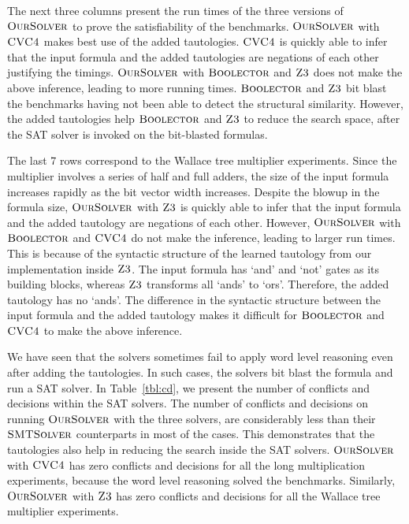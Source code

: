 

The next three columns present the run times of the three versions of
$\textsc{OurSolver}$ to prove the satisfiability of the benchmarks.
%
$\textsc{OurSolver}$ with $\textsc{CVC4}$ makes best use of the added tautologies.
%
$\textsc{CVC4}$ is quickly able to infer that the input formula and the
added tautologies are negations of each other justifying the timings.
%
$\textsc{OurSolver}$ with $\textsc{Boolector}$ and $\textsc{Z3}$ does not make the above
inference, leading to more running times.
%
$\textsc{Boolector}$ and $\textsc{Z3}$ bit blast the benchmarks having not been
able to detect the structural similarity.
%
However, the added tautologies help $\textsc{Boolector}$ and $\textsc{Z3}$ to
reduce the search space, after the SAT solver is invoked on the
bit-blasted formulas.


The last 7 rows correspond to the Wallace tree multiplier experiments.
%
Since the multiplier involves a series of half and full adders, the
size of the input formula increases rapidly as the bit vector width
increases.
%
Despite the blowup in the formula size, $\textsc{OurSolver}$ with $\textsc{Z3}$ is
quickly able to infer that the input formula and the added tautology
are negations of each other.
%
However, $\textsc{OurSolver}$ with $\textsc{Boolector}$ and $\textsc{CVC4}$ do not make the
inference, leading to larger run times.
%
This is because of the syntactic structure of the learned tautology
from our implementation inside $\textsc{Z3}$.
%
The input formula has `and' and `not' gates as its building blocks,
whereas $\textsc{Z3}$ transforms all `ands' to `ors'.
%
Therefore, the added tautology has no `ands'.
%
The difference in the syntactic structure between the input formula
and the added tautology makes it difficult for $\textsc{Boolector}$ and
$\textsc{CVC4}$ to make the above inference.
%

We have seen that the solvers sometimes fail to apply word level
reasoning even after adding the tautologies.
%
In such cases, the solvers bit blast the formula and run a SAT solver.
%
In Table~\ref{tbl:cd}, we present the number of conflicts and decisions within
the SAT solvers.
%
The number of conflicts and decisions on running $\textsc{OurSolver}$ with the
three solvers, are considerably less than their $\textsc{SMTSolver}$
counterparts in most of the cases.
%
This demonstrates that the tautologies also help in reducing the
search inside the SAT solvers. 
%
$\textsc{OurSolver}$ with $\textsc{CVC4}$ has zero conflicts and
decisions for all the long multiplication experiments, because the 
word level reasoning solved the benchmarks.
%
Similarly, $\textsc{OurSolver}$ with $\textsc{Z3}$ has zero conflicts and decisions
for all the Wallace tree multiplier experiments.

